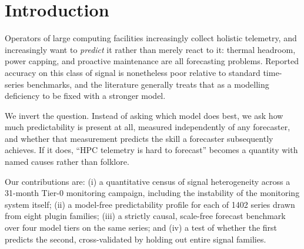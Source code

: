 \documentclass[11pt,a4paper]{article}
\newcommand{\num}[1]{#1}
\begin{document}
\begin{abstract}
Fourth, and contrary to our hypothesis, the measures transfer across signal
families in \emph{ordering} but not in \emph{level}. A model trained on every
family except one ranks the held-out family's series correctly --- median
within-family Spearman \(+0.50\), significant for \num{9} of \num{15}
families and reaching \(+0.83\) --- while assigning the wrong absolute skill,
which is what drives the raw \(R^2\) to a mean of \(-0.19\). Correcting the
level bias moves the mean to \(-0.01\) and makes \num{10} of \num{15} families
positive. A random-group null settles what this means: the same protocol run
with arbitrary groups of matched size transfers easily (median \(R^2\)
\(+0.33\) across draws, every group positive, \(p<0.001\) against the observed
value over \num{100} draws), so the difficulty is specific to crossing family boundaries
rather than a limitation of the protocol. Practically, the profile can rank
which signals in an unfamiliar family will be harder, but not say how hard.
\end{abstract}

\section{Introduction}
\label{sec:intro}

Operators of large computing facilities increasingly collect holistic telemetry,
and increasingly want to \emph{predict} it rather than merely react to it:
thermal headroom, power capping, and proactive maintenance are all forecasting
problems. Reported accuracy on this class of signal is nonetheless poor relative
to standard time-series benchmarks, and the literature generally treats that as
a modelling deficiency to be fixed with a stronger model.

We invert the question. Instead of asking which model does best, we ask how much
predictability is present at all, measured independently of any forecaster, and
whether that measurement predicts the skill a forecaster subsequently achieves.
If it does, ``HPC telemetry is hard to forecast'' becomes a quantity with named
causes rather than folklore.

Our contributions are: (i) a quantitative census of signal heterogeneity across
a 31-month Tier-0 monitoring campaign, including the instability of the
monitoring system itself; (ii) a model-free predictability profile for each of
\num{1402} series drawn from eight plugin families; (iii) a strictly causal,
scale-free forecast benchmark over four model tiers on the same series; and
(iv) a test of whether the first predicts the second, cross-validated by holding
out entire signal families.
\end{document}

